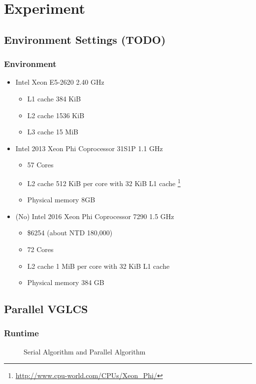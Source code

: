 \section{Experiment}

\subsection{Environment Settings (TODO)}
\begin{frame}
    \frametitle{Environment}
    \begin{itemize}
    	\item Intel Xeon E5-2620 2.40 GHz
    		\begin{itemize}
    		 	\item L1 cache 384 KiB
    		 	\item L2 cache 1536 KiB
    		 	\item L3 cache 15 MiB
    		 \end{itemize}
    	\item Intel 2013 Xeon Phi Coprocessor 31S1P 1.1 GHz
    		\begin{itemize}
    			\item 57 Cores
    			\item L2 cache 512 KiB per core with 32 KiB L1 cache
    			\footnote{\url{http://www.cpu-world.com/CPUs/Xeon_Phi/}}
    			\item Physical memory 8GB
    		\end{itemize}
    	\item (No) Intel 2016 Xeon Phi Coprocessor 7290 1.5 GHz
    		\begin{itemize}
    			\item \$6254 (about NTD 180,000)
    			\item 72 Cores
    			\item L2 cache 1 MiB per core with 32 KiB L1 cache
    			\item Physical memory 384 GB
    		\end{itemize}
    \end{itemize}
\end{frame}

\subsection{Parallel VGLCS}
\begin{frame}
	\frametitle{Runtime}
	\begin{figure}[!ht]
		\centering
		\subfigure[Runtime]{
			
			\label{fig:fig-parallel}
		}
		\caption{Serial Algorithm and Parallel Algorithm}
	\end{figure}
\end{frame}

